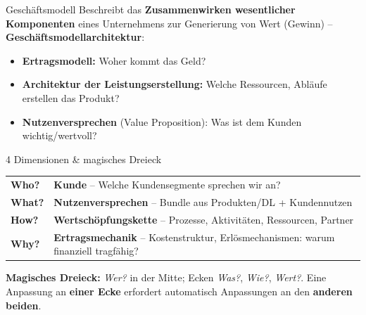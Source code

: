 \documentclass[a4paper, fontsize=7pt]{scrartcl}
\renewcommand*{\arraystretch}{1.5}  %
\begin{document}
\begin{mainbox}{Geschäftsmodell}
Beschreibt das \textbf{Zusammenwirken wesentlicher Komponenten} eines
Unternehmens zur Generierung von Wert (Gewinn) --
\textbf{Geschäftsmodellarchitektur}:
\begin{itemize}
    \item \textbf{Ertragsmodell:} Woher kommt das Geld?
    \item \textbf{Architektur der Leistungserstellung:} Welche Ressourcen,
    Abläufe erstellen das Produkt?
    \item \textbf{Nutzenversprechen} (Value Proposition): Was ist dem Kunden
    wichtig/wertvoll?
\end{itemize}
\end{mainbox}

\begin{mainbox}{4 Dimensionen \& magisches Dreieck}
\renewcommand*{\arraystretch}{1.2}
\begin{tabularx}{\linewidth}{@{}lX@{}}
\textbf{Who?} & \textbf{Kunde} -- Welche Kundensegmente sprechen wir an? \\
\textbf{What?} & \textbf{Nutzenversprechen} -- Bundle aus Produkten/DL +
Kundennutzen \\
\textbf{How?} & \textbf{Wertschöpfungskette} -- Prozesse, Aktivitäten,
Ressourcen, Partner \\
\textbf{Why?} & \textbf{Ertragsmechanik} -- Kostenstruktur,
Erlösmechanismen: warum finanziell tragfähig? \\
\end{tabularx}
\textbf{Magisches Dreieck:} \emph{Wer?} in der Mitte; Ecken \emph{Was?},
\emph{Wie?}, \emph{Wert?}. Eine Anpassung an \textbf{einer Ecke} erfordert
automatisch Anpassungen an den \textbf{anderen beiden}.
\end{mainbox}
\end{document}

